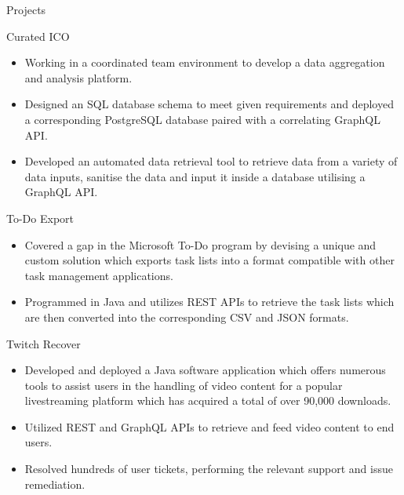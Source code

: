 \documentclass{article}
\newlength{\tabin}
\newlength{\secsep}
\newcommand{\lineunder}{\vspace*{-8pt} \\ \hspace*{-6pt} \hrulefill \\ \vspace*{-15pt}}
\newenvironment{tabbedsection}[1]{
  \begin{list}{}{
      \setlength{\itemsep}{0pt}
      \setlength{\labelsep}{0pt}
      \setlength{\labelwidth}{0pt}
      \setlength{\leftmargin}{\tabin}
      \setlength{\rightmargin}{\tabin}
      \setlength{\listparindent}{0pt}
      \setlength{\parsep}{0pt}
      \setlength{\parskip}{0pt}
      \setlength{\partopsep}{0pt}
      \setlength{\topsep}{#1}
    }
  \item[]
}{\end{list}}
\newenvironment{resume_section}[1]{
  \filbreak
  \vspace{2\secsep}
  \textsc{\large#1}
  \lineunder
  \begin{tabbedsection}{\secsep}
}{\end{tabbedsection}}
\newenvironment{resume_subsection}[2][]{
  \textbf{#2} \hfill {\normalsize #1} \hspace{-5em}
  \begin{tabbedsection}{0.5\secsep}
}{\end{tabbedsection}}
\newenvironment{subitems}{
  \renewcommand{\labelitemi}{-}
  \begin{itemize}
      \setlength{\labelsep}{1em}
}{\end{itemize}}
\begin{document}
\begin{resume_section}{Projects}
	\begin{resume_subsection}{Curated ICO}
		\begin{subitems}
			\item Working in a coordinated team environment to develop a data aggregation and analysis platform.
			\item Designed an SQL database schema to meet given requirements and deployed a corresponding PostgreSQL database paired with a correlating GraphQL API.
			\item Developed an automated data retrieval tool to retrieve data from a variety of data inputs, sanitise the data and input it inside a database utilising a GraphQL API.
		\end{subitems}
	\end{resume_subsection}
	\vspace{2\secsep}
	\begin{resume_subsection}[(February 2021)]{To-Do Export}
  		\begin{subitems} 
  			\item Covered a gap in the Microsoft To-Do program by devising a unique and custom solution which exports task lists into a format compatible with other task management applications.
  			\item Programmed in Java and utilizes REST APIs to retrieve the task lists which are then converted into the corresponding CSV and JSON formats.
    		\end{subitems}
  	\end{resume_subsection}
  	\vspace{2\secsep}
	\begin{resume_subsection}{Twitch Recover}  
		\begin{subitems}
    			\item Developed and deployed a Java software application which offers numerous tools to assist users in the handling of video content for a popular livestreaming platform which has acquired a total of over 90,000 downloads.
    			\item Utilized REST and GraphQL APIs to retrieve and feed video content to end users.
    			\item Resolved hundreds of user tickets, performing the relevant support and issue remediation.
		\end{subitems}

\end{resume_subsection}
\end{resume_section}
\end{document}
